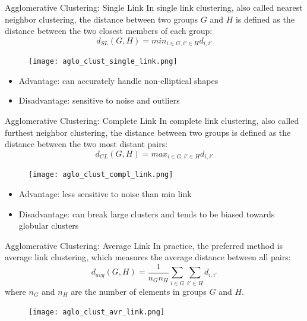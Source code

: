 \documentclass{beamer}
\begin{document}
\begin{frame}{Agglomerative Clustering: Single Link}
 In single link clustering, also called nearest neighbor clustering, the distance between two groups $G$ and $H$ is defined as the distance between the two closest members of each group:
\[d_{SL}(G,H)=min_{i\in G, i'\in H} d_{i,i'}\]
 \begin{figure}
        \centering
        \texttt{[image: aglo\_clust\_single\_link.png]}
        \label{fig:enter-label}
\end{figure}
\begin{itemize}
    \item Advantage: can accurately handle non-elliptical shapes
    \item Disadvantage: sensitive to noise and outliers
\end{itemize}
\end{frame}

\begin{frame}{Agglomerative Clustering: Complete Link}
In complete link clustering, also called furthest neighbor clustering, the distance between
two groups is defined as the distance between the two most distant pairs:
$$d_{CL}(G,H)=max_{i\in G, i'\in H} d_{i,i'}$$
 \begin{figure}
        \centering
        \texttt{[image: aglo\_clust\_compl\_link.png]}
        \label{fig:enter-label}
\end{figure}
\begin{itemize}
    \item Advantage: less sensitive to noise than min link
    \item Disadvantage: can break large clusters and tends to be biased towards globular clusters
\end{itemize}
\end{frame}

\begin{frame}{Agglomerative Clustering: Average Link}
In practice, the preferred method is average link clustering, which measures the average
distance between all pairs:
$$d_{avg}(G,H)=\frac{1}{n_G n_H}\sum_{i\in G}\sum_{ i'\in H} d_{i,i'}$$
where $n_G$ and $n_H$ are the number of elements in groups $G$ and $H$.
 \begin{figure}
        \centering
        \texttt{[image: aglo\_clust\_avr\_link.png]}
        \label{fig:enter-label}
\end{figure}
\end{frame}
\end{document}
